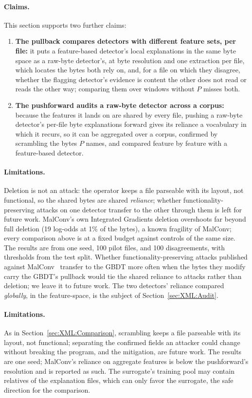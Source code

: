 \paragraph{Claims.} This section supports two further claims:
\begin{enumerate}[noitemsep, topsep=2pt, start=3]
    \item \textbf{The pullback compares detectors with different feature sets, per file:} it puts a feature-based detector's local explanations in the same byte space as a raw-byte detector's, at byte resolution and one extraction per file, which locates the bytes both rely on, and, for a file on which they disagree, whether the flagging detector's evidence is content the other does not read or reads the other way; comparing them over windows without $P$ misses both.
    \item \textbf{The pushforward audits a raw-byte detector across a corpus:} because the features it lands on are shared by every file, pushing a raw-byte detector's per-file byte explanations forward gives its reliance a vocabulary in which it recurs, so it can be aggregated over a corpus, confirmed by scrambling the bytes $P$ names, and compared feature by feature with a feature-based detector.
\end{enumerate}


\paragraph{Limitations.} Deletion is not an attack: the operator keeps a file parseable with its layout, not functional, so the shared bytes are shared \emph{reliance}; whether functionality-preserving attacks on one detector transfer to the other through them is left for future work. MalConv's own Integrated Gradients deletion overshoots far beyond full deletion (19 log-odds at 1\% of the bytes), a known fragility of MalConv; every comparison above is at a fixed budget against controls of the same size. The results are from one seed, 100 pilot files, and 100 disagreements, with thresholds from the test split. Whether functionality-preserving attacks published against MalConv~\cite{demetrio2019explaining} transfer to the GBDT more often when the bytes they modify carry the GBDT's pullback would tie the shared reliance to attacks rather than deletion; we leave it to future work. The two detectors' reliance compared \emph{globally}, in the feature-space, is the subject of Section~\ref{sec:XML:Audit}.

\paragraph{Limitations.} As in Section~\ref{sec:XML:Comparison}, scrambling keeps a file parseable with its layout, not functional; separating the confirmed fields an attacker could change without breaking the program, and the mitigation, are future work. The results are one seed; MalConv's reliance on aggregate features is below the pushforward's resolution and is reported as such. The surrogate's training pool may contain relatives of the explanation files, which can only favor the surrogate, the safe direction for the comparison.

